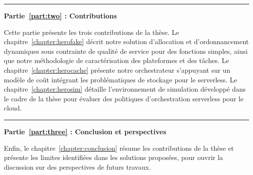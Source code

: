\begin{center}
    \rule{4cm}{0.4pt}
\end{center}

\textbf{Partie~\ref{part:two} : Contributions}

Cette partie présente les trois contributions de la thèse. Le chapitre~\ref{chapter:herofake} décrit notre solution d'allocation et d'ordonnancement dynamiques sous contrainte de qualité de service pour des fonctions simples, ainsi que notre méthodologie de caractérisation des plateformes et des tâches. Le chapitre~\ref{chapter:herocache} présente notre orchestrateur s'appuyant sur un modèle de coût intégrant les problématiques de stockage pour le serverless. Le chapitre~\ref{chapter:herosim} détaille l'environnement de simulation développé dans le cadre de la thèse pour évaluer des politiques d'orchestration serverless pour le cloud.

\begin{center}
    \rule{4cm}{0.4pt}
\end{center}

\textbf{Partie~\ref{part:three} : Conclusion et perspectives}

Enfin, le chapitre~\ref{chapter:conclusion} résume les contributions de la thèse et présente les limites identifiées dans les solutions proposées, pour ouvrir la discussion sur des perspectives de futurs travaux.

